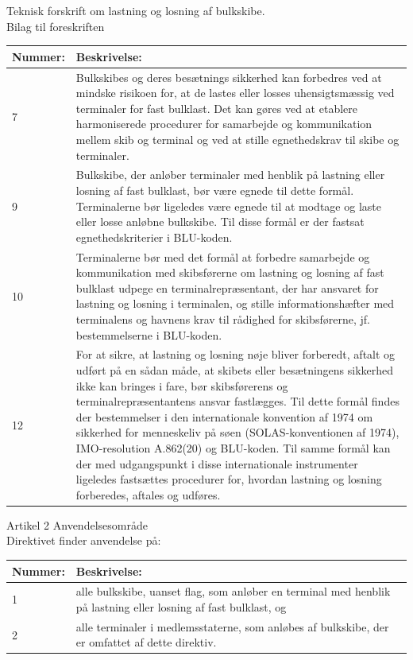 Teknisk forskrift om lastning og losning af bulkskibe.\\
Bilag til foreskriften
\begin{table}[H]
\begin{tabular}{|p{1.5cm}|p{12cm}|} \hline
\cellcolor[gray]{0.85}Nummer: & \cellcolor[gray]{0.85}Beskrivelse:  \\ \hline
7 & Bulkskibes og deres besætnings sikkerhed kan forbedres ved at mindske risikoen for, at de lastes eller losses uhensigtsmæssig ved terminaler for fast bulklast. Det kan gøres ved at etablere harmoniserede procedurer for samarbejde og kommunikation mellem skib og terminal og ved at stille egnethedskrav til skibe og terminaler.   \\ \hline
9 & Bulkskibe, der anløber terminaler med henblik på lastning eller losning af fast bulklast, bør være egnede til dette formål. Terminalerne bør ligeledes være egnede til at modtage og laste eller losse anløbne bulkskibe. Til disse formål er der fastsat egnethedskriterier i BLU-koden. \\ \hline
10 & Terminalerne bør med det formål at forbedre samarbejde og kommunikation med skibsførerne om lastning og losning af fast bulklast udpege en terminalrepræsentant, der har ansvaret for lastning og losning i terminalen, og stille informationshæfter med terminalens og havnens krav til rådighed for skibsførerne, jf. bestemmelserne i BLU-koden. \\ \hline
12 &  For at sikre, at lastning og losning nøje bliver forberedt, aftalt og udført på en sådan måde, at skibets eller besætningens sikkerhed ikke kan bringes i fare, bør skibsførerens og terminalrepræsentantens ansvar fastlægges. Til dette formål findes der bestemmelser i den internationale konvention af 1974 om sikkerhed for menneskeliv på søen (SOLAS-konventionen af 1974), IMO-resolution A.862(20) og BLU-koden. Til samme formål kan der med udgangspunkt i disse internationale instrumenter ligeledes fastsættes procedurer for, hvordan lastning og losning forberedes, aftales og udføres.\\ \hline
\end{tabular}
\end{table}

Artikel 2 Anvendelsesområde\\
Direktivet finder anvendelse på:
\begin{table}[H]
\begin{tabular}{|p{1.5cm}|p{12cm}|} \hline
\cellcolor[gray]{0.85}Nummer: & \cellcolor[gray]{0.85}Beskrivelse:  \\ \hline
1 & alle bulkskibe, uanset flag, som anløber en terminal med henblik på lastning eller losning af fast bulklast, og   \\ \hline
2 & alle terminaler i medlemsstaterne, som anløbes af bulkskibe, der er omfattet af dette direktiv. \\ \hline
\end{tabular}
\end{table}

